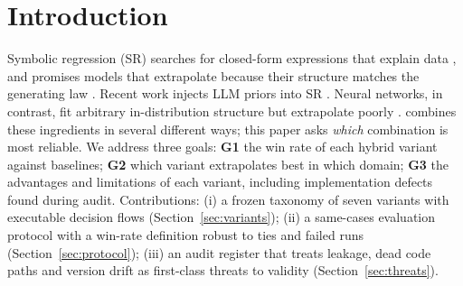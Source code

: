 \section{Introduction}
Symbolic regression (SR) searches for closed-form expressions that explain data \citep{koza1992gp,schmidt2009distilling,cranmer2023pysr}, and promises models that extrapolate because their structure matches the generating law \citep{udrescu2020aifeynman}. Recent work injects LLM priors into SR \citep{shojaee2025llmsr,romeraparedes2024funsearch}. Neural networks, in contrast, fit arbitrary in-distribution structure but extrapolate poorly \citep{xu2021extrapolate,balestriero2021extrapolation}. \HX{} combines these ingredients in several different ways; this paper asks \emph{which} combination is most reliable.
We address three goals: \textbf{G1} the win rate of each hybrid variant against baselines; \textbf{G2} which variant extrapolates best in which domain; \textbf{G3} the advantages and limitations of each variant, including implementation defects found during audit.
Contributions: (i) a frozen taxonomy of seven variants with executable decision flows (Section~\ref{sec:variants}); (ii) a same-cases evaluation protocol with a win-rate definition robust to ties and failed runs (Section~\ref{sec:protocol}); (iii) an audit register that treats leakage, dead code paths and version drift as first-class threats to validity (Section~\ref{sec:threats}).
